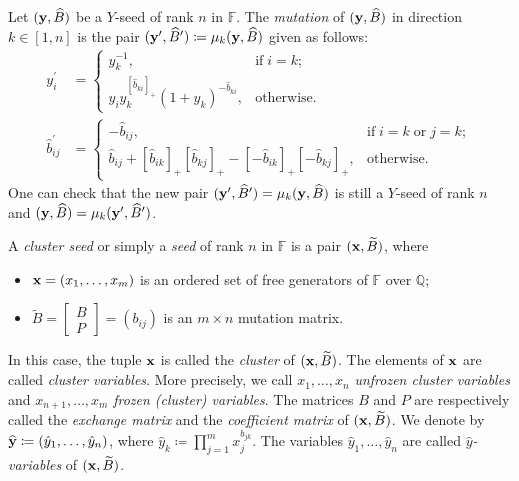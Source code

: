 \documentclass[12pt]{amsart}
\theoremstyle{definition}
\theoremstyle{remark}
\numberwithin{equation}{section}
\begin{document}
Let  $({\bf y}, \widehat B)$ be a $Y$-seed of rank $n$ in $\mathbb F$. The {\em mutation} of  $({\bf y}, \widehat B)$ in direction $k\in[1,n]$ is the pair  $({\bf y}', \widehat B') \coloneqq   \mu_k({\bf y}, \widehat B)$ given as follows:
\begin{align}\label{eqn:y-mutation}
 y_i^\prime&=\begin{cases}y_k^{-1}, &\text{if}\;i=k; \\
y_iy_k^{[\hat b_{ki}]_+}(1+y_k)^{-\hat b_{ki}},&\text{otherwise}.\end{cases}\\
\hat b_{ij}^\prime&=\begin{cases}-\hat b_{ij}, & \text{if}\;i=k\;\text{or}\;j=k;\\
\hat b_{ij}+[\hat b_{ik}]_+[\hat b_{kj}]_+-[-\hat b_{ik}]_+[-\hat b_{kj}]_+,&\text{otherwise}.\end{cases}\nonumber
\end{align}
One can check that the new pair  $({\bf y}', \widehat B')=\mu_k({\bf y}, \widehat B)$ is still a $Y$-seed of rank $n$ and $({\bf y}, \widehat B)=\mu_k({\bf y}', \widehat B')$.







A {\em cluster seed} or simply a {\em seed} of rank $n$ in $\mathbb F$ is a pair
$({\bf x}, \widetilde B)$, where
\begin{itemize}
	\item ${\bf x} = (x_1, \ldots, x_{m})$ is an ordered set of free generators of $\mathbb F$ over $\mathbb Q$;
	\item  $\widetilde B=\begin{bmatrix}
       B\\ P
   \end{bmatrix}=(b_{ij})$ is an $m\times n$ mutation matrix.
\end{itemize}
In this case, the tuple ${\bf x}$ is called the {\it cluster} of $({\bf x}, \widetilde B)$. The elements of ${\bf x}$ are called
{\it cluster variables}. More precisely, we call $x_1,\ldots,x_n$ {\em unfrozen cluster variables} and $x_{n+1},\ldots,x_{m}$ {\em frozen (cluster) variables}.
The matrices $B$ and $P$ are respectively called the {\it  exchange matrix} and the {\it coefficient matrix} of $({\bf x}, \widetilde B)$. We denote by $\widehat {\bf y} \coloneqq   (\hat y_1,\ldots,\hat y_n)$, where $\hat y_k \coloneqq   \prod_{j=1}^mx_j^{b_{jk}}$. The variables $\hat y_1,\ldots,\hat y_n$ are called {\em $\hat y$-variables} of $({\bf x}, \widetilde B)$.
\end{document}
